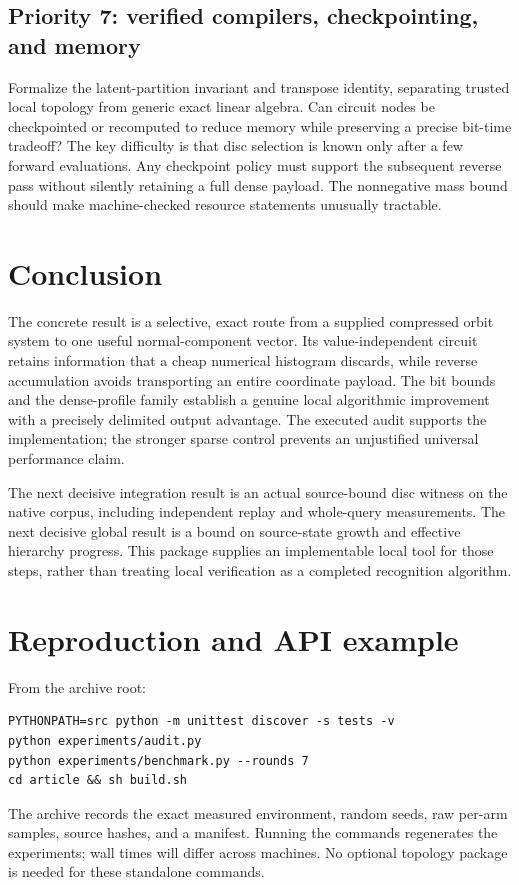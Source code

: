 \documentclass[11pt]{article}
\theoremstyle{definition}\newtheorem{definition}[theorem]{Definition}
\theoremstyle{remark}\newtheorem{remark}[theorem]{Remark}
\begin{document}
\subsection{Priority 7: verified compilers, checkpointing, and memory}
Formalize the latent-partition invariant and transpose identity, separating
trusted local topology from generic exact linear algebra. Can circuit nodes be
checkpointed or recomputed to reduce memory while preserving a precise bit-time
tradeoff? The key difficulty is that disc selection is known only after a few
forward evaluations. Any checkpoint policy must support the subsequent reverse
pass without silently retaining a full dense payload. The nonnegative mass
bound should make machine-checked resource statements unusually tractable.

\section{Conclusion}
The concrete result is a selective, exact route from a supplied compressed orbit
system to one useful normal-component vector. Its value-independent circuit
retains information that a cheap numerical histogram discards, while reverse
accumulation avoids transporting an entire coordinate payload. The bit bounds
and the dense-profile family establish a genuine local algorithmic improvement
with a precisely delimited output advantage. The executed audit supports the
implementation; the stronger sparse control prevents an unjustified universal
performance claim.

The next decisive integration result is an actual source-bound disc witness on
the native corpus, including independent replay and whole-query measurements.
The next decisive global result is a bound on source-state growth and effective
hierarchy progress. This package supplies an implementable local tool for those
steps, rather than treating local verification as a completed recognition
algorithm.

\appendix
\section{Reproduction and API example}
From the archive root:
\begin{lstlisting}
PYTHONPATH=src python -m unittest discover -s tests -v
python experiments/audit.py
python experiments/benchmark.py --rounds 7
cd article && sh build.sh
\end{lstlisting}
The archive records the exact measured environment, random seeds, raw per-arm
samples, source hashes, and a manifest. Running the commands regenerates the
experiments; wall times will differ across machines. No optional topology
package is needed for these standalone commands.
\end{document}
